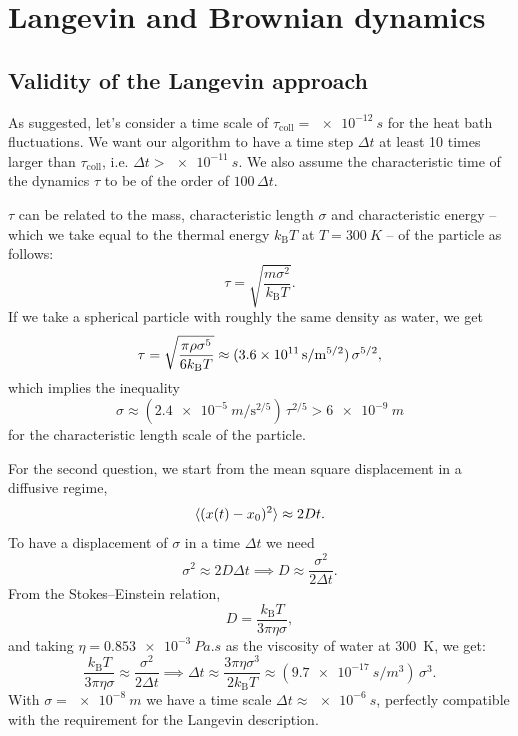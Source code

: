 \chapter{Langevin and Brownian dynamics}

\section{Validity of the Langevin approach}

As suggested, let’s consider a time scale of $\tau_{\mathrm{coll}} =
\qty{e-12}{s}$ for the heat bath fluctuations. We want our algorithm to have a
time step $\Delta t$ at least \num{10} times larger than $\tau_{\mathrm{coll}}$,
i.e. $\Delta t > \qty{e-11}{s}$. We also assume the characteristic time of the
dynamics $\tau$ to be of the order of $\num{100}\, \Delta t$.

$\tau$ can be related to the mass, characteristic length $\sigma$ and
characteristic energy -- which we take equal to the thermal energy
$k_{\mathrm{B}} T$ at $T = \qty{300}{K}$ -- of the particle as follows:
\begin{equation}
  \tau = \sqrt{\frac{m \sigma^{2}}{k_{\mathrm{B}} T}}.
\end{equation}
If we take a spherical particle with roughly the same density as water, we get
\begin{equation}
  \tau = \sqrt{\frac{\pi \rho \sigma^{5}}{6 \smash[b]{k_{\mathrm{B}}} T}}
  \approx (\qty{3.6e11}{s\per\meter^{5/2}}) \, \sigma^{5/2},
\end{equation}
which implies the inequality
\begin{equation}
  \sigma \approx (\qty{2.4e-5}{m\per\second^{2/5}})\, \tau^{2/5} >
  \qty{6e-9}{m}
  \label{eq:langevin-req}
\end{equation}
for the characteristic length scale of the particle.

For the second question, we start from the mean square displacement in a
diffusive regime,
\begin{equation}
  \langle(x(t) - x_{0})^{2}\rangle \approx 2Dt.
\end{equation}
To have a displacement of $\sigma$ in a time $\Delta t$ we need
\begin{equation}
  \sigma^{2} \approx 2 D \Delta t \implies
  D \approx \frac{\sigma^{2}}{2 \Delta t}.
\end{equation}
From the Stokes--Einstein relation,
\begin{equation}
  D = \frac{k_{\mathrm{B}} T}{3 \pi \eta \sigma},
\end{equation}
and taking $\eta = \qty{0.853e-3}{Pa.s}$ as the viscosity of water at
\qty{300}{K}, we get:
\begin{equation}
  \frac{k_{\mathrm{B}} T}{3 \pi \eta \sigma} \approx
  \frac{\sigma^{2}}{2 \Delta t} \implies \Delta t \approx
  \frac{3 \pi \eta \sigma^{3}}{2k_{\mathrm{B}} T} \approx
  (\qty{9.7e-17}{s\per m^{3}}) \, \sigma^{3}.
  \label{eq:timescale-brownian}
\end{equation}
With $\sigma = \qty{e-8}{m}$ we have a time scale $\Delta t \approx
\qty{e-6}{s}$, perfectly compatible with the requirement for the Langevin
description.

